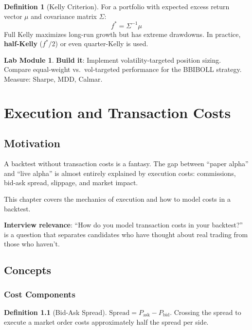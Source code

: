 \documentclass[a4paper, 11pt]{report}
\theoremstyle{definition}
\newtheorem{definition}{Definition}[chapter]
\newtheorem{labmod}{Lab Module}[chapter]
\theoremstyle{remark}
\begin{document}
\begin{definition}[Kelly Criterion]
    For a portfolio with expected excess return vector $\mu$ and covariance
    matrix $\Sigma$:
    \[
        f^* = \Sigma^{-1} \mu
    \]
    Full Kelly maximizes long-run growth but has extreme drawdowns.
    In practice, \textbf{half-Kelly} ($f^*/2$) or even quarter-Kelly is used.
\end{definition}

\begin{labmod}
    \textbf{Build it}: Implement volatility-targeted position sizing.  Compare
    equal-weight vs.\ vol-targeted performance for the BBIBOLL strategy.
    Measure: Sharpe, MDD, Calmar.
\end{labmod}


\chapter{Execution and Transaction Costs}
\label{ch:execution}

\section{Motivation}

A backtest without transaction costs is a fantasy.  The gap between ``paper
alpha'' and ``live alpha'' is almost entirely explained by execution costs:
commissions, bid-ask spread, slippage, and market impact.

This chapter covers the mechanics of execution and how to model costs in a
backtest.

\textbf{Interview relevance}: ``How do you model transaction costs in your
backtest?'' is a question that separates candidates who have thought about
real trading from those who haven't.

\section{Concepts}

\subsection{Cost Components}

\begin{definition}[Bid-Ask Spread]
    $\text{Spread} = P_{\text{ask}} - P_{\text{bid}}$.  Crossing the spread to
    execute a market order costs approximately half the spread per side.
\end{definition}
\end{document}
